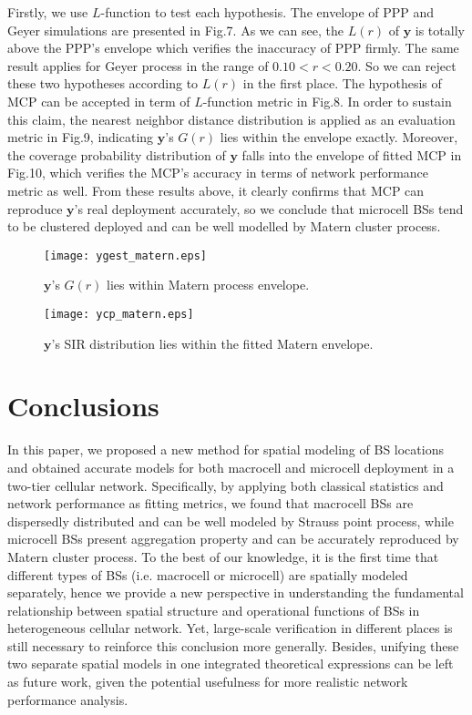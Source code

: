 \documentclass[conference]{IEEEtran}
\begin{document}
Firstly, we use $L$-function to test each hypothesis. The envelope of PPP and Geyer simulations are presented in Fig.7. As we can see, the $L(r)$ of $\mathbf{y}$ is totally above the PPP's envelope which verifies the inaccuracy of PPP firmly. The same result applies for Geyer process in the range of $0.10<r<0.20$. So we can reject these two hypotheses according to $L(r)$ in the first place. The hypothesis of MCP can be accepted in term of $L$-function metric in Fig.8. In order to sustain this claim, the nearest neighbor distance distribution is applied as an evaluation metric in Fig.9, indicating $\mathbf{y}$'s $G(r)$ lies within the envelope exactly. Moreover, the coverage probability distribution of $\mathbf{y}$ falls into the envelope of fitted MCP in Fig.10, which verifies the MCP's accuracy in terms of network performance metric as well. From these results above, it clearly confirms that MCP can reproduce $\mathbf{y}$'s real deployment accurately, so we conclude that microcell BSs tend to be clustered deployed and can be well modelled by Matern cluster process.

\begin{figure}[!t]
\centering
\texttt{[image: ygest\_matern.eps]}
\caption{$\mathbf{y}$'s $G(r)$ lies within Matern process envelope.}
\end{figure}

\begin{figure}[!t]
\centering
\texttt{[image: ycp\_matern.eps]}
\caption{$\mathbf{y}$'s SIR distribution lies within the fitted Matern envelope.}
\end{figure}

\section{Conclusions}
In this paper, we proposed a new method for spatial modeling of BS locations and obtained accurate models for both macrocell and microcell deployment in a two-tier cellular network. Specifically, by applying both classical statistics and network performance as fitting metrics, we found that macrocell BSs are dispersedly distributed and can be well modeled by Strauss point process, while microcell BSs present aggregation property and can be accurately reproduced by Matern cluster process.
To the best of our knowledge, it is the first time that different types of BSs (i.e. macrocell or microcell) are spatially modeled separately, hence we provide a new perspective in understanding the fundamental relationship between spatial structure and operational functions of BSs in heterogeneous cellular network. Yet, large-scale verification in different places is still necessary to reinforce this conclusion more generally. Besides, unifying these two separate spatial models in one integrated theoretical expressions can be left as future work, given the potential usefulness for more realistic network performance analysis.
\end{document}
